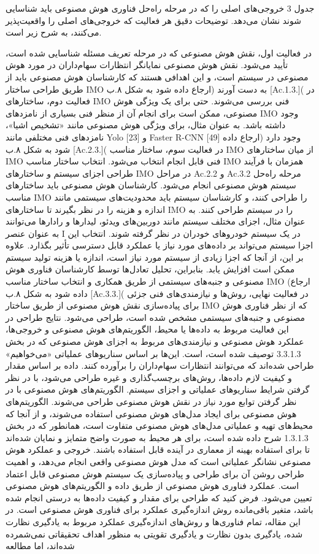 \documentclass[a4paper,10pt]{article}
\begin{document}
                    جدول 3 خروجی‌های اصلی را که در مرحله راه‌حل فناوری هوش مصنوعی باید شناسایی شوند نشان می‌دهد. توضیحات دقیق هر فعالیت که خروجی‌های اصلی را واقعیت‌پذیر می‌کنند، به شرح زیر است.

                    در فعالیت اول، نقش هوش مصنوعی که در مرحله تعریف مسئله شناسایی شده است، تأیید می‌شود. نقش هوش مصنوعی نمایانگر انتظارات سهام‌داران در مورد هوش مصنوعی در سیستم است، و این اهدافی هستند که کارشناسان هوش مصنوعی باید از طریق طراحی ساختار IMO به دست آورند (ارجاع داده شود به شکل ۸.ب [Ac.1.3.]( در فعالیت دوم، ساختارهای IMO فنی بررسی می‌شوند. حتی برای یک ویژگی هوش مصنوعی، ممکن است برای انجام آن از منظر فنی بسیاری از نامزدهای IMO وجود داشته باشد. به عنوان مثال، برای ویژگی هوش مصنوعی مانند «تشخیص اشیا»، نامزدهای فنی مختلفی مانند Yolo [23] و Faster R-CNN [49] وجود دارد (ارجاع داده شود به شکل ۸.ب [Ac.2.3.]( در فعالیت سوم، ساختار مناسب IMO از میان ساختارهای IMO فنی قابل انجام انتخاب می‌شود. انتخاب ساختار مناسب IMO همزمان با فرآیند طراحی اجزای سیستم و ساختارهای IMO در مراحل Ac.2.2 و Ac.3.2 مرحله راه‌حل سیستم هوش مصنوعی انجام می‌شود. کارشناسان هوش مصنوعی باید ساختارهای مناسب IMO را طراحی کنند، و کارشناسان سیستم باید محدودیت‌های سیستمی مانند اندازه و هزینه را در نظر بگیرند تا ساختارهای IMO را در سیستم طراحی کنند. به عنوان مثال، اجزای مختلف سیستم مانند دوربین‌های ویدئو، لیدارها و رادارها می‌توانند به عنوان عنصر I در یک سیستم خودروهای خودران در نظر گرفته شوند. انتخاب این اجزا سیستم می‌تواند بر داده‌های مورد نیاز یا عملکرد قابل دسترسی تأثیر بگذارد. علاوه بر این، از آنجا که اجزا زیادی از سیستم مورد نیاز است، اندازه یا هزینه تولید سیستم ممکن است افزایش یابد. بنابراین، تحلیل تعادل‌ها توسط کارشناسان فناوری هوش مصنوعی و جنبه‌های سیستمی از طریق همکاری و انتخاب ساختار مناسب IMO (ارجاع داده شود به شکل ۸.ب [Ac.3.3.]( در فعالیت نهایی، روش‌ها و نیازمندی‌های فنی جزئی برای پیاده‌سازی نقش هوش مصنوعی از طریق ساختار IMO که از نظر فناوری هوش مصنوعی و جنبه‌های سیستمی مشخص شده است، طراحی می‌شود. نتایج طراحی در این فعالیت مربوط به داده‌ها یا محیط، الگوریتم‌های هوش مصنوعی و خروجی‌ها، عملکرد هوش مصنوعی و نیازمندی‌های مربوط به اجزای هوش مصنوعی که در بخش 3.3.1.3 توصیف شده است، است. این‌ها بر اساس سناریوهای عملیاتی «می‌خواهیم» طراحی شده‌اند که می‌توانند انتظارات سهام‌داران را برآورده کنند. داده بر اساس مقدار و کیفیت لازم داده‌ها، روش‌های برچسب‌گذاری و غیره طراحی می‌شود، با در نظر گرفتن شرایط سناریوهای عملیاتی و اجزای سیستم. الگوریتم‌های هوش مصنوعی با در نظر گرفتن توابع مورد نیاز در نقش هوش مصنوعی طراحی می‌شوند. الگوریتم‌های هوش مصنوعی برای ایجاد مدل‌های هوش مصنوعی استفاده می‌شوند، و از آنجا که محیط‌های تهیه و عملیاتی مدل‌های هوش مصنوعی متفاوت است، همانطور که در بخش 1.3.1.3 شرح داده شده است، برای هر محیط به صورت واضح متمایز و نمایان شده‌اند تا برای استفاده بهینه از معماری در آینده قابل استفاده باشند. خروجی و عملکرد هوش مصنوعی نشانگر عملیاتی است که مدل هوش مصنوعی واقعی انجام می‌دهد، و اهمیت طراحی روشن آن برای طراحی و پیاده‌سازی یک سیستم هوش مصنوعی قابل اعتماد است. عملکرد فناوری هوش مصنوعی از طریق داده و الگوریتم‌های هوش مصنوعی تعیین می‌شود. فرض کنید که طراحی برای مقدار و کیفیت داده‌ها به درستی انجام شده باشد، متغیر باقی‌مانده روش اندازه‌گیری عملکرد برای فناوری هوش مصنوعی است. در این مقاله، تمام فناوری‌ها و روش‌های اندازه‌گیری عملکرد مربوط به یادگیری نظارت شده، یادگیری بدون نظارت و یادگیری تقویتی به منظور اهداف تحقیقاتی نمی‌شمرده شده‌اند، اما مطالعه 
\end{document}
